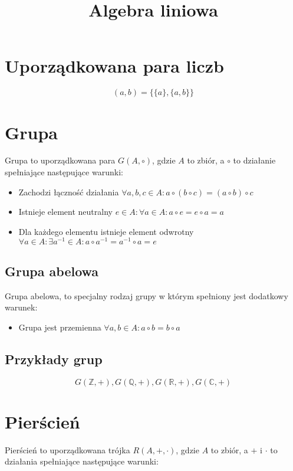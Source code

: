 \documentclass{../notatki}
\title{Algebra liniowa}
\begin{document}
\tableofcontents

\section{Uporządkowana para liczb}

$$
(a, b) = \{ \{a\}, \{a, b\} \}
$$

\section{Grupa}

Grupa to uporządkowana para $G(A, \circ)$, gdzie $A$ to zbiór, a
$\circ$ to działanie spełniające następujące warunki:

\begin{itemize}
  \item Zachodzi łączność działania $\forall a, b, c \in A: a \circ
    (b \circ c) = (a \circ b) \circ c$
  \item Istnieje element neutralny $e \in A: \forall a \in A: a \circ
    e = e \circ a = a$
  \item Dla każdego elementu istnieje element odwrotny $\forall a \in
    A: \exists a^{-1} \in A: a \circ a^{-1} = a^{-1} \circ a = e$
\end{itemize}

\subsection{Grupa abelowa}

Grupa abelowa, to specjalny rodzaj grupy w którym spełniony jest
dodatkowy warunek:

\begin{itemize}
  \item Grupa jest przemienna $\forall a, b \in A: a \circ b = b \circ a$
\end{itemize}

\subsection{Przykłady grup}

$$
G(\mathbb{Z}, +), G(\mathbb{Q}, +), G(\mathbb{R}, +), G(\mathbb{C}, +)
$$

\section{Pierścień}

Pierścień to uporządkowana trójka $R(A, +, \cdot)$, gdzie $A$ to
zbiór, a $+$ i $\cdot$ to działania spełniające następujące warunki:
\end{document}
